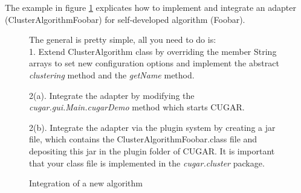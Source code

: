 \documentclass[a4paper, 11pt]{article}
\begin{document}
		The example in figure \ref{integration} explicates how to implement and integrate an adapter (ClusterAlgorithmFoobar) for self-developed algorithm (Foobar). \\
		
		\begin{figure}[h!]
		The general is pretty simple, all you need to do is:\\
		
		1. Extend ClusterAlgorithm class by overriding the member String arrays to set new configuration options and implement 
		the abstract \emph{clustering} method and the \emph{getName} method.
		

		2(a). Integrate the adapter by modifying the \emph{cugar.gui.Main.cugarDemo} method which starts CUGAR.
		
		
		2(b). Integrate the adapter via the plugin system by creating a jar file, 
		which contains the ClusterAlgorithmFoobar.class file and depositing this jar in the plugin folder of CUGAR. 
		It is important that your class file is implemented in the \emph{cugar.cluster} package.
		\caption{Integration of a new algorithm}\label{integration}\end{figure} 
		
\end{document}
